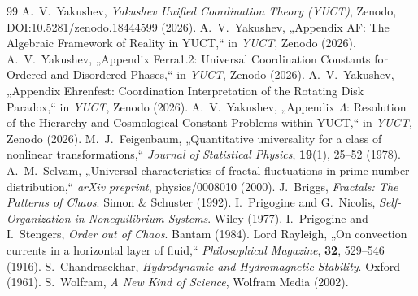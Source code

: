 \documentclass[11pt,a4paper]{article}
\begin{document}
	\begin{thebibliography}{99}
		 A.~V.~Yakushev, \emph{Yakushev Unified Coordination Theory (YUCT)}, Zenodo, DOI:10.5281/zenodo.18444599 (2026).
		 A.~V.~Yakushev, „Appendix AF: The Algebraic Framework of Reality in YUCT,“ in \emph{YUCT}, Zenodo (2026).
		 A.~V.~Yakushev, „Appendix Ferra1.2: Universal Coordination Constants for Ordered and Disordered Phases,“ in \emph{YUCT}, Zenodo (2026).
		 A.~V.~Yakushev, „Appendix Ehrenfest: Coordination Interpretation of the Rotating Disk Paradox,“ in \emph{YUCT}, Zenodo (2026).
		 A.~V.~Yakushev, „Appendix $\Lambda$: Resolution of the Hierarchy and Cosmological Constant Problems within YUCT,“ in \emph{YUCT}, Zenodo (2026).
		 M.~J.~Feigenbaum, „Quantitative universality for a class of nonlinear transformations,“ \emph{Journal of Statistical Physics}, \textbf{19}(1), 25--52 (1978).
		 A.~M.~Selvam, „Universal characteristics of fractal fluctuations in prime number distribution,“ \emph{arXiv preprint}, physics/0008010 (2000).
		 J.~Briggs, \emph{Fractals: The Patterns of Chaos}. Simon \& Schuster (1992).
		 I.~Prigogine and G.~Nicolis, \emph{Self-Organization in Nonequilibrium Systems}. Wiley (1977).
		 I.~Prigogine and I.~Stengers, \emph{Order out of Chaos}. Bantam (1984).
		 Lord Rayleigh, „On convection currents in a horizontal layer of fluid,“ \emph{Philosophical Magazine}, \textbf{32}, 529--546 (1916).
		 S.~Chandrasekhar, \emph{Hydrodynamic and Hydromagnetic Stability}. Oxford (1961).
		 S.~Wolfram, \emph{A New Kind of Science}, Wolfram Media (2002).
	\end{thebibliography}
	
\end{document}

